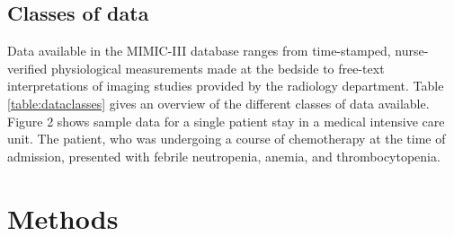 \documentclass[english]{article}
\begin{document}



\subsection*{Classes of data}

Data available in the MIMIC-III database ranges from time-stamped, nurse-verified physiological measurements made at the bedside to free-text interpretations of imaging studies provided by the radiology department. Table \ref{table:dataclasses} gives an overview of the different classes of data available. Figure 2 shows sample data for a single patient stay in a medical intensive care unit. The patient, who was undergoing a course of chemotherapy at the time of admission, presented with febrile neutropenia, anemia, and thrombocytopenia.

\section*{Methods}


\end{document}
